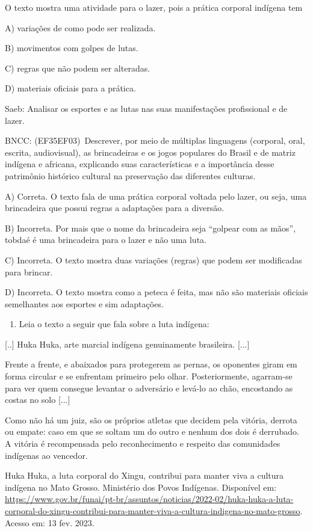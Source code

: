 O texto mostra uma atividade para o lazer, pois a prática corporal
indígena tem

A) variações de como pode ser realizada.

B) movimentos com golpes de lutas.

C) regras que não podem ser alteradas.

D) materiais oficiais para a prática.

Saeb: Analisar os esportes e as lutas nas suas manifestações
profissional e de lazer.

BNCC: (EF35EF03)~Descrever, por meio de múltiplas linguagens (corporal,
oral, escrita, audiovisual), as brincadeiras e os jogos populares do
Brasil e de matriz indígena e africana, explicando suas características
e a importância desse patrimônio histórico cultural na preservação das
diferentes culturas.

A) Correta. O texto fala de uma prática corporal voltada pelo lazer, ou
seja, uma brincadeira que possui regras a adaptações para a diversão.

B) Incorreta. Por mais que o nome da brincadeira seja ``golpear com as
mãos'', tobdaé é uma brincadeira para o lazer e não uma luta.

C) Incorreta. O texto mostra duas variações (regras) que podem ser
modificadas para brincar.

D) Incorreta. O texto mostra como a peteca é feita, mas não são
materiais oficiais semelhantes aos esportes e sim adaptações.

\begin{enumerate}
\def\labelenumi{\arabic{enumi}.}
\item
  Leia o texto a seguir que fala sobre a luta indígena:
\end{enumerate}

{[}..{]} Huka Huka, arte marcial indígena genuinamente brasileira.
{[}...{]}

Frente a frente, e abaixados para protegerem as pernas, os oponentes
giram em forma circular e se enfrentam primeiro pelo olhar.
Posteriormente, agarram-se para ver quem consegue levantar o adversário
e levá-lo ao chão, encostando as costas no solo {[}...{]}

Como não há um juiz, são os próprios atletas que decidem pela vitória,
derrota ou empate: caso em que se soltam um do outro e nenhum dos dois é
derrubado. A vitória é recompensada pelo reconhecimento e respeito das
comunidades indígenas ao vencedor.

Huka Huka, a luta corporal do Xingu, contribui para manter viva a
cultura indígena no Mato Grosso. Ministério dos Povos Indígenas.
Disponível em:
\url{https://www.gov.br/funai/pt-br/assuntos/noticias/2022-02/huka-huka-a-luta-corporal-do-xingu-contribui-para-manter-viva-a-cultura-indigena-no-mato-grosso}.
Acesso em: 13 fev. 2023.

